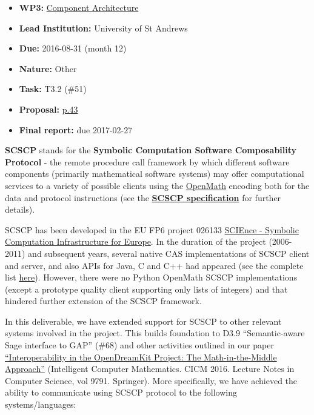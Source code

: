 \begin{itemize}
\tightlist
\item
  \textbf{WP3:}
  \href{https://github.com/OpenDreamKit/OpenDreamKit/tree/master/WP3}{Component
  Architecture}
\item
  \textbf{Lead Institution:} University of St Andrews
\item
  \textbf{Due:} 2016-08-31 (month 12)
\item
  \textbf{Nature:} Other
\item
  \textbf{Task:} T3.2 (\#51)
\item
  \textbf{Proposal:}
  \href{https://github.com/OpenDreamKit/OpenDreamKit/raw/master/Proposal/proposal-www.pdf}{p.43}
\item
  \textbf{Final report:} due 2017-02-27
\end{itemize}

\textbf{SCSCP} stands for the \textbf{Symbolic Computation Software
Composability Protocol} - the remote procedure call framework by which
different software components (primarily mathematical software systems)
may offer computational services to a variety of possible clients using
the \href{http://www.openmath.org/}{OpenMath} encoding both for the data
and protocol instructions (see the
\href{http://www.symbolic-computing.org/scscp}{\textbf{SCSCP
specification}} for further details).

SCSCP has been developed in the EU FP6 project 026133
\href{http://www.symbolic-computing.org/}{SCIEnce - Symbolic Computation
Infrastructure for Europe}. In the duration of the project (2006-2011)
and subsequent years, several native CAS implementations of SCSCP client
and server, and also APIs for Java, C and C++ had appeared (see the
complete list \href{http://www.symbolic-computing.org/}{here}). However,
there were no Python OpenMath SCSCP implementations (except a prototype
quality client supporting only lists of integers) and that hindered
further extension of the SCSCP framework.

In this deliverable, we have extended support for SCSCP to other
relevant systems involved in the project. This builds foundation to D3.9
``Semantic-aware Sage interface to GAP'' (\#68) and other activities
outlined in our paper
\href{https://dx.doi.org/10.1007/978-3-319-42547-4_9}{``Interoperability
in the OpenDreamKit Project: The Math-in-the-Middle Approach''}
(Intelligent Computer Mathematics. CICM 2016. Lecture Notes in Computer
Science, vol 9791. Springer). More specifically, we have achieved the
ability to communicate using SCSCP protocol to the following
systems/languages: 


